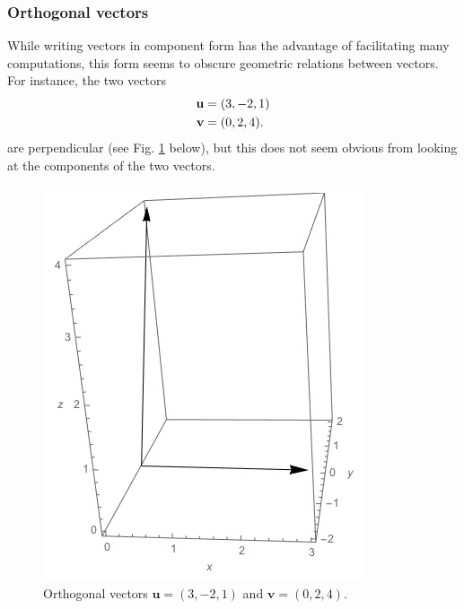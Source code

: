 \documentclass[12pt,letterpaper,reqno]{article}
\numberwithin{equation}{section}
\begin{document}
\subsubsection{Orthogonal vectors}
While writing vectors in component form has the advantage of facilitating many computations, this form seems to obscure geometric relations between vectors.
For instance, the two vectors
\begin{align*}
	{\bf u}&=(3,-2,1) \\
	{\bf v}&=(0,2,4).
\end{align*}
are perpendicular (see Fig. \ref{fig:orthog_vecz} below), but this does not seem obvious from looking at the components of the two vectors. 
\begin{figure}[h]\label{fig:orthog_vecz}
	\begin{center}
		\includegraphics[scale=0.5]{figures_mvc/orthog_vecz}
	\end{center}
	\caption{Orthogonal vectors $\mathbf{u}=(3,-2,1)$ and $\mathbf{v}=(0,2,4)$.}
\end{figure}
\end{document}
